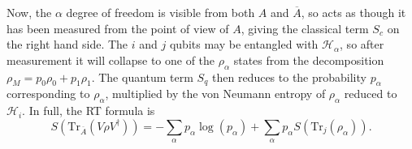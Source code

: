 \documentclass[12pt,a4paper]{report}
\numberwithin{equation}{section}
\newcommand{\ol}[1]{\overline{#1}}
\newcommand{\tr}{\text{Tr}}
\theoremstyle{definition}
\theoremstyle{theorem}
\theoremstyle{theorem}
\theoremstyle{example}
\theoremstyle{definition}
\begin{document}
Now, the $\alpha$ degree of freedom is visible from both $A$ and $\ol{A}$, so acts as though it has been measured from the point of view of $A$, giving the classical term $S_{c}$ on the right hand side. The $i$ and $j$ qubits may be entangled with $\mathcal{H}_{\alpha}$, so after measurement it will collapse to one of the $\rho_{\alpha}$ states from the decomposition $\rho_{M}=p_{0}\rho_{0}+p_{1}\rho_{1}$. The quantum term $S_{q}$ then reduces to the probability $p_{\alpha}$ corresponding to $\rho_{\alpha}$, multiplied by the von Neumann entropy of $\rho_{\alpha}$ reduced to $\mathcal{H}_{i}$. In full, the RT formula is
\begin{equation}
	S\left(\tr_{\ol{A}}\left(V\rho V^{\dagger}\right)\right)=-\sum_{\alpha}p_{\alpha}\log\left(p_{\alpha}\right)+\sum_{\alpha}p_{\alpha}S\left(\tr_{j}\left(\rho_{\alpha}\right)\right).
\end{equation}
\end{document}
